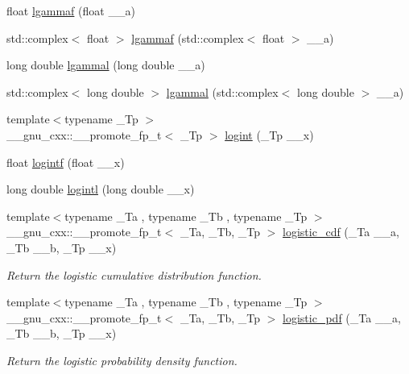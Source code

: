 \begin{DoxyCompactItemize}
\item 
float \hyperlink{group__gnu__math__spec__func_ga37956b360838b5b2f98c8e5cfd15d307}{lgammaf} (float \+\_\+\+\_\+a)
\item 
std\+::complex$<$ float $>$ \hyperlink{group__gnu__math__spec__func_ga5b10ee6e92d8707a151b00086889b2ea}{lgammaf} (std\+::complex$<$ float $>$ \+\_\+\+\_\+a)
\item 
long double \hyperlink{group__gnu__math__spec__func_gabc66f234f4554cd5ff878792cc85bd37}{lgammal} (long double \+\_\+\+\_\+a)
\item 
std\+::complex$<$ long double $>$ \hyperlink{group__gnu__math__spec__func_ga5f12f60afe9a47f4ca04964f642bbf0d}{lgammal} (std\+::complex$<$ long double $>$ \+\_\+\+\_\+a)
\item 
{\footnotesize template$<$typename \+\_\+\+Tp $>$ }\\\+\_\+\+\_\+gnu\+\_\+cxx\+::\+\_\+\+\_\+promote\+\_\+fp\+\_\+t$<$ \+\_\+\+Tp $>$ \hyperlink{group__gnu__math__spec__func_gab9635c9acbe4120358c3cba8931dc54d}{logint} (\+\_\+\+Tp \+\_\+\+\_\+x)
\item 
float \hyperlink{group__gnu__math__spec__func_gab878da3ba2f5c1d49d96eadde533b233}{logintf} (float \+\_\+\+\_\+x)
\item 
long double \hyperlink{group__gnu__math__spec__func_gab17f5cadc8f77ba2666d0d5ecc78de5d}{logintl} (long double \+\_\+\+\_\+x)
\item 
{\footnotesize template$<$typename \+\_\+\+Ta , typename \+\_\+\+Tb , typename \+\_\+\+Tp $>$ }\\\+\_\+\+\_\+gnu\+\_\+cxx\+::\+\_\+\+\_\+promote\+\_\+fp\+\_\+t$<$ \+\_\+\+Ta, \+\_\+\+Tb, \+\_\+\+Tp $>$ \hyperlink{group__gnu__math__spec__func_ga5a4ad2c21300e112def147c1c832a651}{logistic\+\_\+cdf} (\+\_\+\+Ta \+\_\+\+\_\+a, \+\_\+\+Tb \+\_\+\+\_\+b, \+\_\+\+Tp \+\_\+\+\_\+x)
\begin{DoxyCompactList}\small\item\em Return the logistic cumulative distribution function. \end{DoxyCompactList}\item 
{\footnotesize template$<$typename \+\_\+\+Ta , typename \+\_\+\+Tb , typename \+\_\+\+Tp $>$ }\\\+\_\+\+\_\+gnu\+\_\+cxx\+::\+\_\+\+\_\+promote\+\_\+fp\+\_\+t$<$ \+\_\+\+Ta, \+\_\+\+Tb, \+\_\+\+Tp $>$ \hyperlink{group__gnu__math__spec__func_ga6c3f760a8485f4b4feed6b275bf9db82}{logistic\+\_\+pdf} (\+\_\+\+Ta \+\_\+\+\_\+a, \+\_\+\+Tb \+\_\+\+\_\+b, \+\_\+\+Tp \+\_\+\+\_\+x)
\begin{DoxyCompactList}\small\item\em Return the logistic probability density function. \end{DoxyCompactList}\item 

\end{DoxyCompactItemize}
